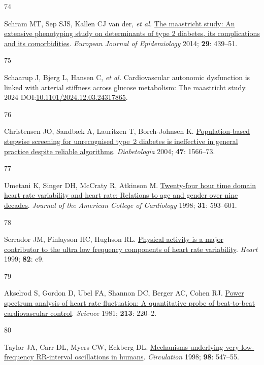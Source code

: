 \documentclass[
  letterpaper,
  headsepline=true,
  open=any]{scrbook}
\newlength{\cslhangindent}
\newlength{\csllabelwidth}
\newlength{\cslentryspacingunit} %
\newenvironment{CSLReferences}[2] %
 {%
  \setlength{\parindent}{0pt}
  \ifodd #1
  \let\oldpar\par
  \def\par{\hangindent=\cslhangindent\oldpar}
  \fi
  \setlength{\parskip}{#2\cslentryspacingunit}
 }%
 {}
\newcommand{\CSLLeftMargin}[1]{\parbox[t]{\csllabelwidth}{#1}}
\newcommand{\CSLRightInline}[1]{\parbox[t]{\linewidth - \csllabelwidth}{#1}\break}
\begin{document}
\begin{CSLReferences}{0}{0}
\leavevmode{}%
\CSLLeftMargin{74 }%
\CSLRightInline{Schram MT, Sep SJS, Kallen CJ van der, \emph{et al.}
\href{https://doi.org/10.1007/s10654-014-9889-0}{The maastricht study:
An extensive phenotyping study on determinants of type 2 diabetes, its
complications and its comorbidities}. \emph{European Journal of
Epidemiology} 2014; \textbf{29}: 439--51.}

\leavevmode{}%
\CSLLeftMargin{75 }%
\CSLRightInline{Schaarup J, Bjerg L, Hansen C, \emph{et al.}
Cardiovascular autonomic dysfunction is linked with arterial stiffness
across glucose metabolism: The maastricht study. 2024
DOI:\href{https://doi.org/10.1101/2024.12.03.24317865}{10.1101/2024.12.03.24317865}.}

\leavevmode{}%
\CSLLeftMargin{76 }%
\CSLRightInline{Christensen JO, Sandbæk A, Lauritzen T, Borch-Johnsen K.
\href{https://doi.org/10.1007/s00125-004-1496-2}{Population-based
stepwise screening for unrecognised type~2 diabetes is ineffective in
general practice despite reliable algorithms}. \emph{Diabetologia} 2004;
\textbf{47}: 1566--73.}

\leavevmode{}%
\CSLLeftMargin{77 }%
\CSLRightInline{Umetani K, Singer DH, McCraty R, Atkinson M.
\href{https://doi.org/10.1016/S0735-1097(97)00554-8}{Twenty-four hour
time domain heart rate variability and heart rate: Relations to age and
gender over nine decades}. \emph{Journal of the American College of
Cardiology} 1998; \textbf{31}: 593--601.}

\leavevmode{}%
\CSLLeftMargin{78 }%
\CSLRightInline{Serrador JM, Finlayson HC, Hughson RL.
\href{https://doi.org/10.1136/hrt.82.6.e9}{Physical activity is a major
contributor to the ultra low frequency components of heart rate
variability}. \emph{Heart} 1999; \textbf{82}: e9.}

\leavevmode{}%
\CSLLeftMargin{79 }%
\CSLRightInline{Akselrod S, Gordon D, Ubel FA, Shannon DC, Berger AC,
Cohen RJ. \href{https://doi.org/10.1126/science.6166045}{Power spectrum
analysis of heart rate fluctuation: A quantitative probe of beat-to-beat
cardiovascular control}. \emph{Science} 1981; \textbf{213}: 220--2.}

\leavevmode{}%
\CSLLeftMargin{80 }%
\CSLRightInline{Taylor JA, Carr DL, Myers CW, Eckberg DL.
\href{https://doi.org/10.1161/01.CIR.98.6.547}{Mechanisms underlying
very-low-frequency RR-interval oscillations in humans}.
\emph{Circulation} 1998; \textbf{98}: 547--55.}


\end{CSLReferences}
\end{document}
